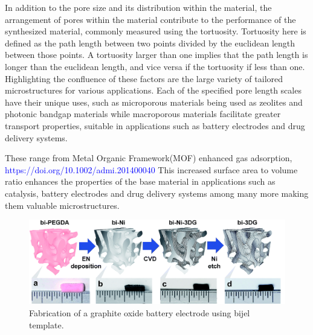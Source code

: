 In addition to the pore size and its distribution within the material, the arrangement of pores within the material contribute to the performance of the synthesized material, commonly measured using the tortuosity. Tortuosity here is defined as the path length between two points divided by the euclidean length between those points. A tortuosity larger than one implies that the path length is longer than the euclidean length, and vice versa if the tortuosity if less than one. Highlighting the confluence of these factors are the large variety of tailored microstructures for various applications. Each of the specified pore length scales have their unique uses, such as microporous materials being used as zeolites and photonic bandgap materials while macroporous materials facilitate greater transport properties, suitable in applications such as battery electrodes and drug delivery systems. \cite{chen_tortuosity_2020, ebner_tortuosity_2014} 

These range from Metal Organic Framework(MOF) enhanced gas adsorption, \textcolor{blue}{https://doi.org/10.1002/admi.201400040} This increased surface area to volume ratio enhances the properties of the base material in applications such as catalysis, battery electrodes and drug delivery systems among many more making them valuable microstructures. \cite{cha_bicontinuous_2019, samdani_bicontinuous_2017, thorson_bijel-templated_2019}

\begin{figure}
    \centering
    \includegraphics[scale = 0.5]{figures/introduction/bijel_templating.png}
    \caption{Fabrication of a graphite oxide battery electrode using bijel template. \cite{garcia_scalable_2019}}
    \label{fig:bijel_template}
\end{figure}

